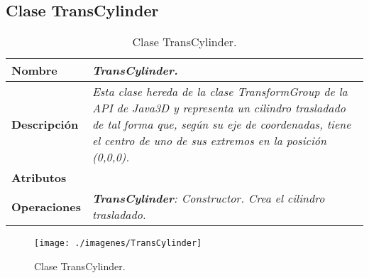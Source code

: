       \subsection{Clase TransCylinder}
         \begin{table}[!ht] 
            \centering
            \begin{tabular}{|p{4cm}|p{11.5cm}|}
            \hline
            \textbf{Nombre} & \textit{TransCylinder.}\\ \hline
            \textbf{Descripción} & \textit{Esta clase hereda de la clase TransformGroup de la API de Java3D y representa
                                    un cilindro trasladado de tal forma que, según su eje de coordenadas, tiene el centro
                                    de uno de sus extremos en la posición (0,0,0).}\\ \hline
            \textbf{Atributos} & \\ \hline
            \textbf{Operaciones} & \textit{\textbf{TransCylinder}: Constructor. Crea el cilindro trasladado.}\\ \hline
            \end{tabular}
            \caption{Clase TransCylinder.}
         \end{table}
         \begin{figure} [H] \begin{center}
            \texttt{[image: ./imagenes/TransCylinder]}\label{TransCylinder}
            \caption{Clase TransCylinder.}
         \end{center} \end{figure}


